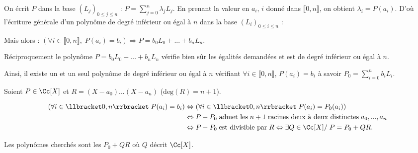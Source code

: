 {{On écrit $P$ dans la base $(L_j)_{0\leqslant j\leqslant n}$ : $P=\sum_{j=0}^{n}\lambda_jL_j$. 
En prenant la valeur en $a_i$, $i$ donné dans $\llbracket0,n\rrbracket$, on obtient $\lambda_i= P(a_i)$. D'où l'écriture générale d'un polynôme de degré inférieur ou égal à $n$ dans la base $(L_i)_{0\leqslant i\leqslant n}$ : 

\begin{center}
\end{center}

Mais alors : $(\forall i\in\llbracket0,n\rrbracket,\;P(a_i)=b_i)\Rightarrow P=b_0L_0 + ... + b_nL_n$.

 
Réciproquement le polynôme $P= b_0L_0+ ... +b_nL_n$ vérifie bien sûr les égalités demandées et est de degré inférieur ou égal à $n$.

Ainsi, il existe un et un seul polynôme de degré inférieur ou égal à $n$ vérifiant $\forall i\in\llbracket0,n\rrbracket$, $P(a_i)=b_i$ à savoir $P_0=\sum_{i=0}^{n}b_iL_i$.

Soient $P\in\Cc[X]$ et $R=(X-a_0) ... (X-a_n)$ ($\text{deg}(R)=n+1$).

\begin{align*}\ensuremath
(\forall i\in\llbracket0,n\rrbracket\;P(a_i) = b_i)&\Leftrightarrow(\forall i\in\llbracket0,n\rrbracket\;P(a_i)=P_0(a_i))\\
 &\Leftrightarrow P-P_0\;\text{admet les}\;n+1\;\text{racines deux à deux distinctes}\;a_0,...,a_n\\
  &\Leftrightarrow P-P_0\;\text{est divisible par}\;R\Leftrightarrow\exists Q\in\Cc[X]/\;P= P_0+QR.
\end{align*}

Les polynômes cherchés sont les $P_0+QR$ où $Q$ décrit $\Cc[X]$.}
}